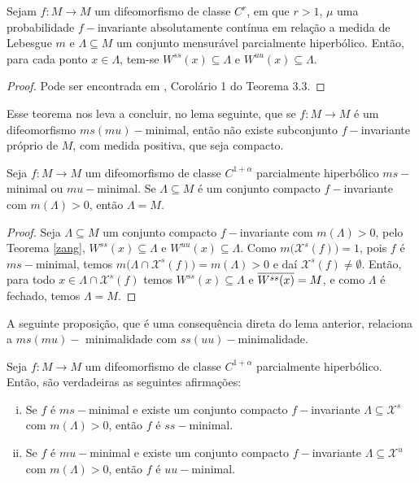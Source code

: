 \begin{teorema}\label{zang} Sejam $f:M\to M$ um difeomorfismo de classe $C^r$, em que $r>1$, $\mu$ uma probabilidade $f-$invariante absolutamente contínua em relação a medida de Lebesgue $m$ e $\Lambda\subseteq M$ um conjunto mensurável parcialmente hiperbólico. Então, para cada ponto $x\in\Lambda$, tem-se $W^{ss}(x)\subseteq \Lambda$ e $W^{uu}(x)\subseteq \Lambda$.
\end{teorema}

\begin{proof} Pode ser encontrada em \cite{zang}, Corolário 1 do Teorema 3.3.
\end{proof}

Esse teorema nos leva a concluir, no lema seguinte, que se $f:M\to M$ é um difeomorfismo $ms(mu)-$minimal, então não existe subconjunto $f-$invariante próprio de $M$, com medida positiva, que seja compacto.

\begin{lema}\label{lzang} Seja $f:M\to M$ um difeomorfismo de classe $C^{1+\alpha}$ parcialmente hiperbólico $ms-$minimal ou $mu-$minimal. Se $\Lambda\subseteq M$ é um conjunto compacto $f-$invariante com $m(\Lambda)>0$, então $\Lambda=M$.
\end{lema} 

\begin{proof} Seja $\Lambda\subseteq M$ um conjunto compacto $f-$invariante com $m(\Lambda)>0$, pelo Teorema \ref{zang}, $W^{ss}(x)\subseteq \Lambda$ e $W^{uu}(x)\subseteq \Lambda$. Como $m\big(\mathcal{X}^s(f)\big)=1$, pois $f$ é $ms-$minimal, temos $m\big(\Lambda\cap\mathcal{X}^s(f)\big)=m(\Lambda)>0$ e daí $\mathcal{X}^s(f)\neq\emptyset$. Então, para todo $x\in\Lambda\cap\mathcal{X}^s(f)$ temos $W^{ss}(x)\subseteq \Lambda$ e $\overline{W^{ss}(x)}=M$, e como $\Lambda$ é fechado, temos $\Lambda=M$.
\end{proof}

A seguinte proposição, que é uma consequência direta do lema anterior, relaciona a $ms(mu)-$ mi\-ni\-ma\-li\-da\-de com $ss(uu)-$mi\-ni\-ma\-li\-da\-de.

\begin{proposicao} Seja $f:M\to M$ um difeomorfismo de classe $C^{1+\alpha}$ parcialmente hiperbólico. Então, são verdadeiras as seguintes afirmações:
\begin{enumerate}[i)]
\item Se $f$ é $ms-$minimal e existe um conjunto compacto $f-$invariante $\Lambda\subseteq\mathcal{X}^s$ com $m(\Lambda)>0$, então $f$ é $ss-$minimal. 
\item Se $f$ é $mu-$minimal e existe um conjunto compacto $f-$invariante $\Lambda\subseteq\mathcal{X}^u$ com $m(\Lambda)>0$, então $f$ é $uu-$minimal. 
\end{enumerate}
\end{proposicao}

